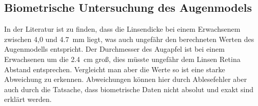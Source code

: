 \subsection{Biometrische Untersuchung des Augenmodels}
In der Literatur \cite{wiki} ist zu finden, dass die Linsendicke bei einem Erwachsenem
zwischen 4,0 und \SI{4.7}{\milli\meter} liegt, was auch ungefähr den berechneten
Werten des Augenmodells entspricht. Der Durchmesser des Augapfel ist bei
einem Erwachsenen um die \SI{2.4}{\centi\meter} groß, dies müsste ungefähr dem
Linsen Retina Abstand entsprechen. Vergleicht man aber die Werte so ist eine
starke Abweichung zu erkennen. Abweichungen können hier durch Ablesefehler aber
auch durch die Tatsache, dass biometrische Daten nicht absolut und exakt sind erklärt werden.
